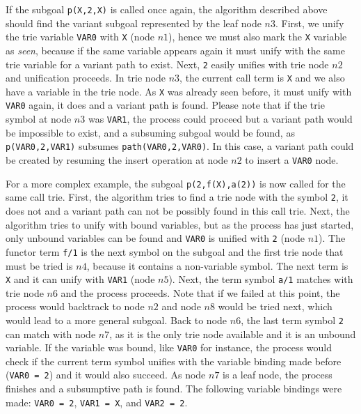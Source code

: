 If the subgoal \texttt{p(X,2,X)} is called once again, the algorithm described above
should find the variant subgoal represented by the leaf node $n3$. First, we unify the trie variable
\texttt{VAR0} with \texttt{X} (node $n1$), hence we must also mark the \texttt{X} variable as \textit{seen},
because if the same variable appears again it must unify with the same trie variable for a variant path
to exist. Next, \texttt{2} easily unifies with trie node $n2$ and unification proceeds. In trie node $n3$,
the current call term is \texttt{X} and we also have a variable in the trie node. As \texttt{X} was already seen before,
it must unify with \texttt{VAR0} again, it does and a variant path is found. Please note that if
the trie symbol at node $n3$ was \texttt{VAR1}, the process could proceed but a variant path would be impossible
to exist, and a subsuming subgoal would be found, as \texttt{p(VAR0,2,VAR1)} subsumes \texttt{path(VAR0,2,VAR0)}.
In this case, a variant path could be created by resuming the insert operation at node $n2$ to insert
a \texttt{VAR0} node.

For a more complex example, the subgoal \texttt{p(2,f(X),a(2))} is now called for the same call trie. First,
the algorithm tries to find a trie node with the symbol \texttt{2}, it does not and a variant path
can not be possibly found in this call trie. Next, the algorithm tries to unify with bound variables, but as the process
has just started, only unbound variables can be found and \texttt{VAR0} is unified with \texttt{2} (node $n1$).
The functor term \texttt{f/1} is the next symbol on the subgoal and the first trie node that must be tried is $n4$,
because it contains a non-variable symbol. The next term is \texttt{X} and it can unify with \texttt{VAR1} (node $n5$).
Next, the term symbol \texttt{a/1} matches with trie node $n6$ and the process proceeds. Note that if we failed
at this point, the process would backtrack to node $n2$ and node $n8$ would be tried next, which would
lead to a more general subgoal. Back to node $n6$, the last term symbol \texttt{2} can match with node $n7$, as it is the only trie
node available and it is an unbound variable. If the variable was bound, like \texttt{VAR0} for instance,
the process would check if the current term symbol unifies with the variable binding made before (\texttt{VAR0 = 2}) and
it would also succeed. As node $n7$ is a leaf node, the process finishes and a subsumptive path is found.
The following variable bindings were made: \texttt{VAR0 = 2}, \texttt{VAR1 = X}, and \texttt{VAR2 = 2}.

